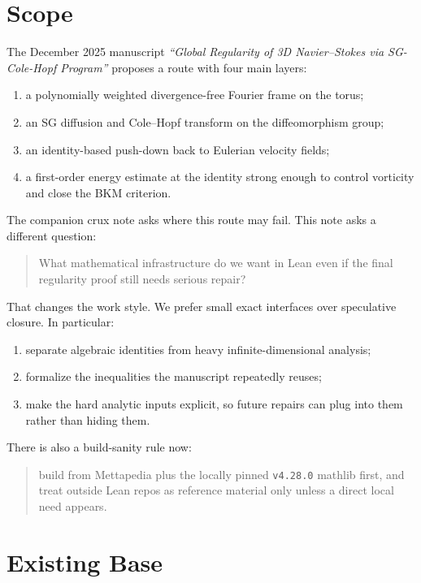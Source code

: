 \documentclass[11pt]{article}
\theoremstyle{remark}
\begin{document}
\tableofcontents

\section{Scope}

The December 2025 manuscript
\emph{``Global Regularity of 3D Navier--Stokes via SG-Cole-Hopf Program''}
proposes a route with four main layers:
\begin{enumerate}[leftmargin=1.5em]
  \item a polynomially weighted divergence-free Fourier frame on the torus;
  \item an SG diffusion and Cole--Hopf transform on the diffeomorphism group;
  \item an identity-based push-down back to Eulerian velocity fields;
  \item a first-order energy estimate at the identity strong enough to control
  vorticity and close the BKM criterion.
\end{enumerate}

The companion crux note asks where this route may fail.  This note asks a
different question:
\begin{quote}
What mathematical infrastructure do we want in Lean even if the final
regularity proof still needs serious repair?
\end{quote}

That changes the work style.  We prefer small exact interfaces over speculative
closure.  In particular:
\begin{enumerate}[leftmargin=1.5em]
  \item separate algebraic identities from heavy infinite-dimensional analysis;
  \item formalize the inequalities the manuscript repeatedly reuses;
  \item make the hard analytic inputs explicit, so future repairs can plug into
  them rather than hiding them.
\end{enumerate}

There is also a build-sanity rule now:
\begin{quote}
build from Mettapedia plus the locally pinned \texttt{v4.28.0} mathlib first,
and treat outside Lean repos as reference material only unless a direct local
need appears.
\end{quote}

\section{Existing Base}
\end{document}

